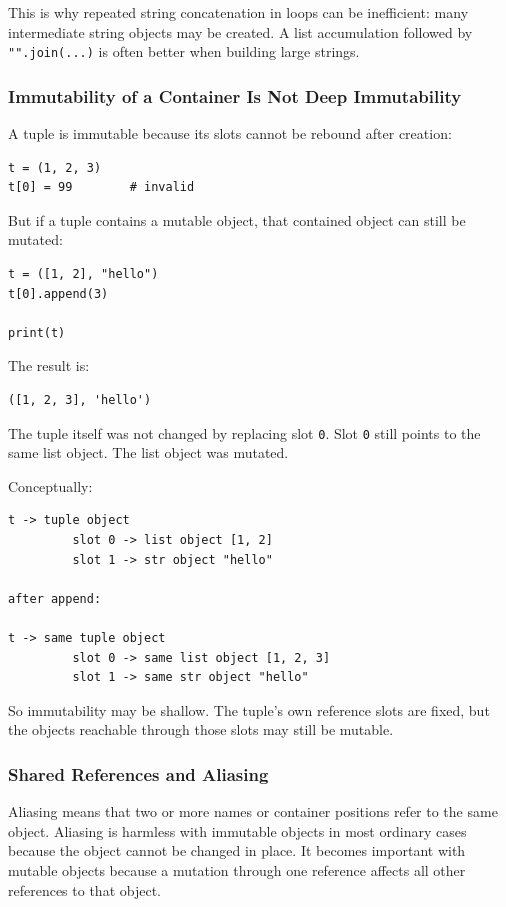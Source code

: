 This is why repeated string concatenation in loops can be inefficient: many intermediate string objects may be created. A list accumulation followed by \texttt{"".join(...)} is often better when building large strings.

\subsubsection*{Immutability of a Container Is Not Deep Immutability}

A tuple is immutable because its slots cannot be rebound after creation:

\begin{verbatim}
t = (1, 2, 3)
t[0] = 99        # invalid
\end{verbatim}

But if a tuple contains a mutable object, that contained object can still be mutated:

\begin{verbatim}
t = ([1, 2], "hello")
t[0].append(3)

print(t)
\end{verbatim}

The result is:

\begin{verbatim}
([1, 2, 3], 'hello')
\end{verbatim}

The tuple itself was not changed by replacing slot \texttt{0}. Slot \texttt{0} still points to the same list object. The list object was mutated.

Conceptually:

\begin{verbatim}
t -> tuple object
         slot 0 -> list object [1, 2]
         slot 1 -> str object "hello"

after append:

t -> same tuple object
         slot 0 -> same list object [1, 2, 3]
         slot 1 -> same str object "hello"
\end{verbatim}

So immutability may be shallow. The tuple's own reference slots are fixed, but the objects reachable through those slots may still be mutable.

\subsubsection*{Shared References and Aliasing}

Aliasing means that two or more names or container positions refer to the same object. Aliasing is harmless with immutable objects in most ordinary cases because the object cannot be changed in place. It becomes important with mutable objects because a mutation through one reference affects all other references to that object.


